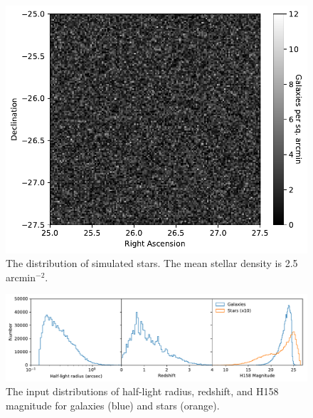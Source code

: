 \documentclass[aps,prd, amsmath,amssymb,superscriptaddress,showkeys,nofootinbib,reprint,preprintnumbers]{revtex4-1}
\begin{document}
\begin{figure}
\begin{center}
\includegraphics[width=\columnwidth]{figures/stars.pdf}
\end{center}
\caption[]{
The distribution of simulated stars. The mean stellar density is 2.5 arcmin$^{-2}$. 
\label{fig:stars}}
\end{figure}

\begin{figure}
\begin{center}
\includegraphics[width=\textwidth]{figures/hist.pdf}
\end{center}
\caption[]{
The input distributions of half-light radius, redshift, and H158 magnitude for galaxies (blue) and stars (orange).
\label{fig:hist}}
\end{figure}
\end{document}
